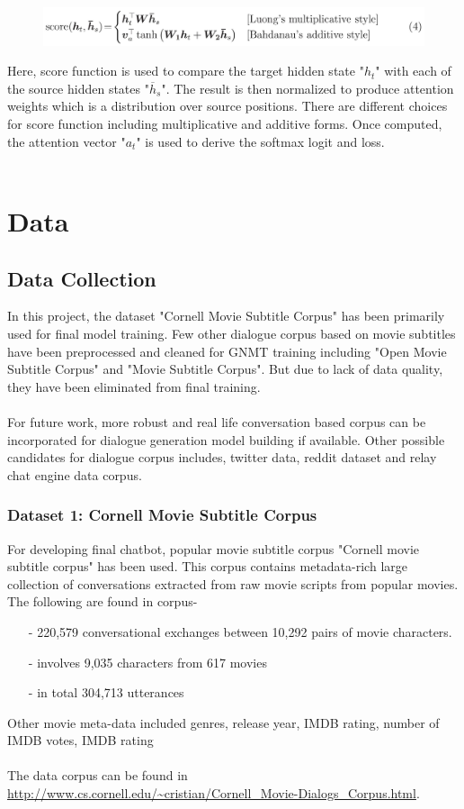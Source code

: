 \documentclass[a4paper,12pt]{report}
\begin{document}
\begin{figure}[H]
\begin{center}
\includegraphics[scale=.18]{attention_equation_1}
\end{center}
\end{figure}
Here, score function is used to compare the target hidden state "$h_t$" with each of the source hidden states "$\overline{h}_s$". The result is then normalized to produce attention weights which is a distribution over source positions. There are different choices for score function including multiplicative and additive forms. Once computed, the attention vector "$a_t$" is used to derive the softmax logit and loss.\\\\

{\let\clearpage\relax \chapter {Data}}
\section {Data Collection}
In this project, the dataset "Cornell Movie Subtitle Corpus" has been primarily used for final model training. Few other dialogue corpus based on movie subtitles have been preprocessed and cleaned for GNMT training including "Open Movie Subtitle Corpus" and "Movie Subtitle Corpus". But due to lack of data quality, they have been eliminated from final training.\\\\
For future work, more robust and real life conversation based corpus can be incorporated for dialogue generation model building if available. Other possible candidates for dialogue corpus includes, twitter data, reddit dataset and relay chat engine data corpus.
\subsection {Dataset 1: Cornell Movie Subtitle Corpus}
For developing final chatbot, popular movie subtitle corpus "Cornell movie subtitle corpus" has been used. This corpus contains metadata-rich large collection of conversations extracted from raw movie scripts from popular movies.\\
The following are found in corpus-
\begin{itemize}
\item[-] 220,579 conversational exchanges between 10,292 pairs of movie characters.
\item[-] involves 9,035 characters from 617 movies
\item[-] in total 304,713 utterances
\end{itemize}
Other movie meta-data included genres, release year, IMDB rating, number of IMDB votes, IMDB rating\\\\
The data corpus can be found in \url{http://www.cs.cornell.edu/~cristian/Cornell_Movie-Dialogs_Corpus.html}.
\end{document}
